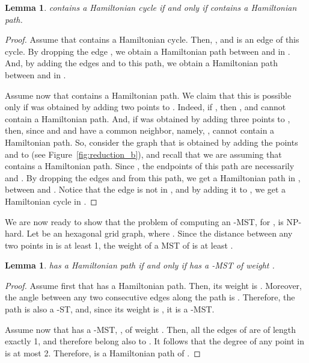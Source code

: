 \documentclass[11pt]{article}
\newtheorem{lemma}[theorem]{Lemma}
\begin{document}
\begin{lemma}
 contains a Hamiltonian cycle if and only if  contains a Hamiltonian path.
\end{lemma}
\begin{proof}
Assume that  contains a Hamiltonian cycle. Then, , and  is an edge of this cycle. By dropping the edge , we obtain a Hamiltonian path between  and  in . And, by adding the edges  and  to this path, we obtain a Hamiltonian path between  and  in . 

Assume now that  contains a Hamiltonian path. We claim that this is possible only if  was obtained by adding two points to . Indeed, if , then , and  cannot contain a Hamiltonian path. And, if  was obtained by adding three points to , then, since  and  and  have a common neighbor, namely, ,  cannot contain a Hamiltonian path. 
So, consider the graph  that is obtained by adding the points  and  to  (see Figure~\ref{fig:reduction_b}), and recall that we are assuming that  contains a Hamiltonian path. Since , the endpoints of this path are necessarily  and . By dropping the edges  and  from this path, we get a Hamiltonian path  in , between  and . Notice that the edge  is not in , and by adding it to , we get a Hamiltonian cycle in . 
\end{proof}

We are now ready to show that the problem of computing an -MST, for , is NP-hard.
Let  be an hexagonal grid graph, where . Since the distance between any two points in  is at least 1, the weight of a MST of  is at least .
\begin{lemma}
 has a Hamiltonian path if and only if  has a -MST of weight . 
\end{lemma}
\begin{proof}
Assume first that  has a Hamiltonian path. Then, its weight is . Moreover, the angle between any two consecutive edges along the path is . Therefore, the path is also a -ST, and, since its weight is , it is a -MST.

Assume now that  has a -MST, , of weight .
Then, all the edges of  are of length exactly 1, and therefore belong also to . It follows that the degree of any point in  is at most 2. Therefore,  is a Hamiltonian path of . 
\end{proof}
\end{document}
